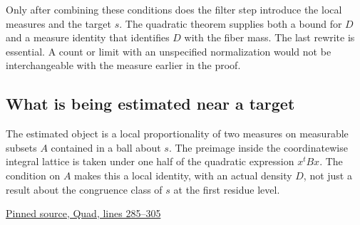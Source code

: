 \documentclass[12pt,letterpaper]{article}
\begin{document}
Only after combining these conditions does the filter step introduce the local measures and the target \(s\). The quadratic theorem supplies both a bound for \(D\) and a measure identity that identifies \(D\) with the fiber mass. The last rewrite is essential. A count or limit with an unspecified normalization would not be interchangeable with the measure earlier in the proof.

\clearpage\subsection*{What is being estimated near a target}

The estimated object is a local proportionality of two measures on measurable subsets \(A\) contained in a ball about \(s\). The preimage inside the coordinatewise integral lattice is taken under one half of the quadratic expression \(x^t Bx\). The condition on \(A\) makes this a local identity, with an actual density \(D\), not just a result about the congruence class of \(s\) at the first residue level.

\par\smallskip\href{https://github.com/nousentllc/riemann-hypothesis/blob/40e56bab026552e089d7afcfeff08d2defb9c005/src/CompanionTheory/SpectralGeometry/LocalGlobalProofs/AdelicAnalysis/LocalQuadraticDensityBoundNonzero.lean#L285-L305}{\sffamily\small Pinned source, Quad, lines 285--305}\par
\end{document}
